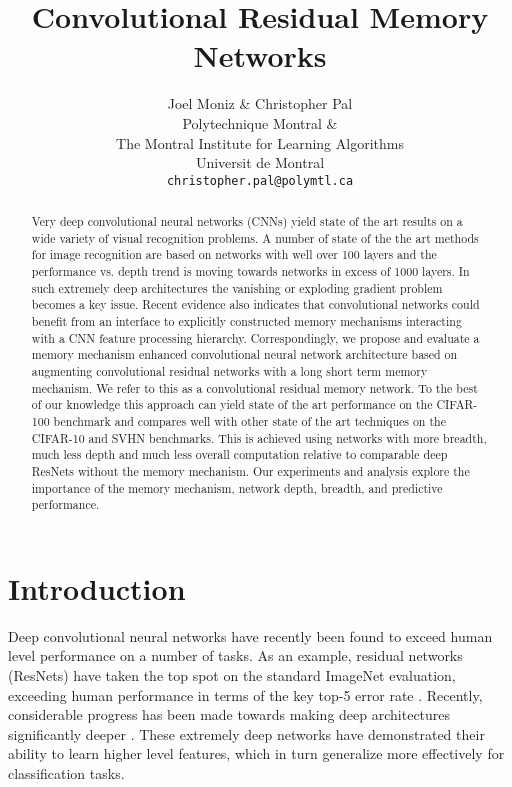 \documentclass{article}
\title{Convolutional Residual Memory Networks}
\author{
  Joel Moniz \& Christopher Pal \\
  Polytechnique Montral \& \\
  The Montral Institute for Learning Algorithms\\
  Universit de Montral \\
  \texttt{christopher.pal@polymtl.ca} \\
}
\begin{document}

\maketitle

\begin{abstract}
Very deep convolutional neural networks (CNNs) yield state of the art results on a wide variety of visual recognition problems. A number of state of the the art methods for image recognition are based on networks with well over 100 layers and the performance vs. depth trend is moving towards networks in excess of 1000 layers. In such extremely deep architectures the vanishing or exploding gradient problem becomes a key issue. Recent evidence also indicates that convolutional networks could benefit from an interface to explicitly constructed memory mechanisms interacting with a CNN feature processing hierarchy. Correspondingly, we propose and evaluate a memory mechanism enhanced convolutional neural network architecture based on augmenting convolutional residual networks with a long short term memory mechanism. We refer to this as a convolutional residual memory network. To the best of our knowledge this approach can yield state of the art performance on the CIFAR-100 benchmark and compares well with other state of the art techniques on the CIFAR-10 and SVHN benchmarks. This is achieved using networks with more breadth, much less depth and much less overall computation relative to comparable deep ResNets without the memory mechanism. Our experiments and analysis explore the importance of the memory mechanism, network depth, breadth, and predictive performance.
%
\end{abstract}

\section{Introduction}

Deep convolutional neural networks have recently been found to exceed human level performance on a number of tasks. As an example, residual networks (ResNets) have taken the top spot on the standard ImageNet evaluation, exceeding human performance in terms of the key top-5 error rate \cite{he2015deep}.
%
Recently, considerable progress has been made towards making deep architectures significantly deeper \cite{simonyan2014very, szegedy2015going, srivastava2015training, he2015deep, he2016identity}. %
These extremely deep networks have demonstrated their ability to learn higher level features, which in turn generalize more effectively for classification tasks.
\end{document}
